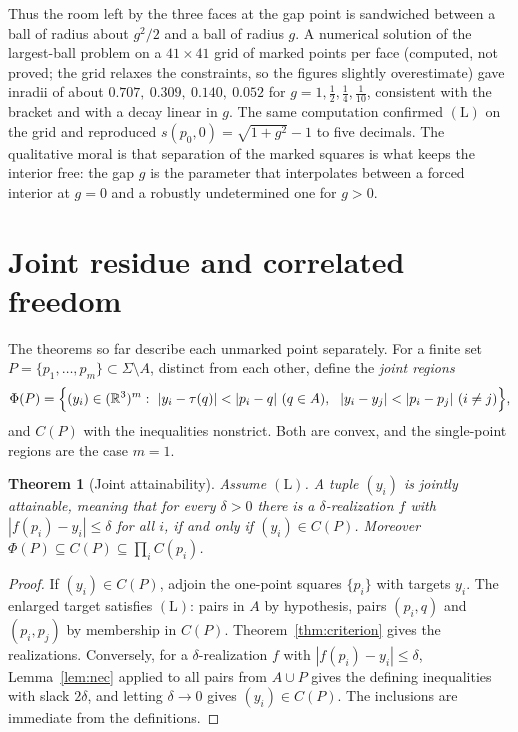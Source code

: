 \documentclass[11pt]{article}
\newtheorem{theorem}{Theorem}
\theoremstyle{definition}
\theoremstyle{remark}
\begin{document}
Thus the room left by the three faces at the gap point is sandwiched between a ball of radius about $g^2/2$ and a ball of radius $g$. A numerical solution of the largest-ball problem on a $41\times41$ grid of marked points per face (computed, not proved; the grid relaxes the constraints, so the figures slightly overestimate) gave inradii of about $0.707,\ 0.309,\ 0.140,\ 0.052$ for $g=1,\tfrac12,\tfrac14,\tfrac1{10}$, consistent with the bracket and with a decay linear in $g$. The same computation confirmed $(\mathrm L)$ on the grid and reproduced $s(p_0,0)=\sqrt{1+g^2}-1$ to five decimals. The qualitative moral is that separation of the marked squares is what keeps the interior free: the gap $g$ is the parameter that interpolates between a forced interior at $g=0$ and a robustly undetermined one for $g>0$.

\section{Joint residue and correlated freedom}

The theorems so far describe each unmarked point separately. For a finite set $P=\{p_1,\dots,p_m\}\subset\Sigma\setminus A$, distinct from each other, define the \emph{joint regions}
\[
\Phi(P)=\Bigl\{(y_i)\in(\mathbb R^3)^m:\ |y_i-\tau(q)|<|p_i-q|\ (q\in A),\ \ |y_i-y_j|<|p_i-p_j|\ (i\ne j)\Bigr\},
\]
and $C(P)$ with the inequalities nonstrict. Both are convex, and the single-point regions are the case $m=1$.

\begin{theorem}[Joint attainability]\label{thm:joint}
Assume $(\mathrm L)$. A tuple $(y_i)$ is jointly attainable, meaning that for every $\delta>0$ there is a $\delta$-realization $f$ with $|f(p_i)-y_i|\le\delta$ for all $i$, if and only if $(y_i)\in C(P)$. Moreover $\Phi(P)\subseteq C(P)\subseteq\prod_iC(p_i)$.
\end{theorem}

\begin{proof}
If $(y_i)\in C(P)$, adjoin the one-point squares $\{p_i\}$ with targets $y_i$. The enlarged target satisfies $(\mathrm L)$: pairs in $A$ by hypothesis, pairs $(p_i,q)$ and $(p_i,p_j)$ by membership in $C(P)$. Theorem~\ref{thm:criterion} gives the realizations. Conversely, for a $\delta$-realization $f$ with $|f(p_i)-y_i|\le\delta$, Lemma~\ref{lem:nec} applied to all pairs from $A\cup P$ gives the defining inequalities with slack $2\delta$, and letting $\delta\to0$ gives $(y_i)\in C(P)$. The inclusions are immediate from the definitions.
\end{proof}
\end{document}
